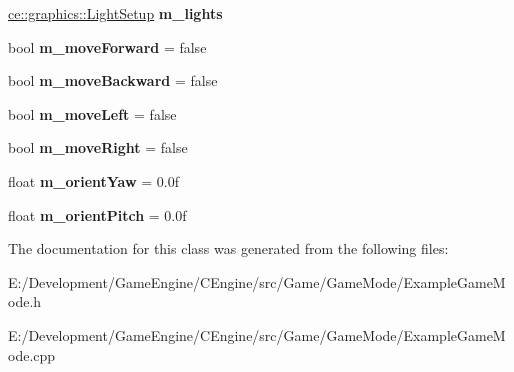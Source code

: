 \begin{DoxyCompactItemize}
\item 
\mbox{\label{classce_1_1game_1_1_example_game_mode_ab39f4d293ea643da5ccac64011366209}} 
\hyperlink{structce_1_1graphics_1_1_light_setup}{ce\+::graphics\+::\+Light\+Setup} {\bfseries m\+\_\+lights}
\item 
\mbox{\label{classce_1_1game_1_1_example_game_mode_aba71b1c261ba5df986a23915413f31e0}} 
bool {\bfseries m\+\_\+move\+Forward} = false
\item 
\mbox{\label{classce_1_1game_1_1_example_game_mode_aacf6c7d0c299cbf0ca24e1e952c3f24a}} 
bool {\bfseries m\+\_\+move\+Backward} = false
\item 
\mbox{\label{classce_1_1game_1_1_example_game_mode_a95c5e1b487e7dda6ac2214a9a3b8c058}} 
bool {\bfseries m\+\_\+move\+Left} = false
\item 
\mbox{\label{classce_1_1game_1_1_example_game_mode_aa45b83aacdc3f4077bd7acb6a55df3f7}} 
bool {\bfseries m\+\_\+move\+Right} = false
\item 
\mbox{\label{classce_1_1game_1_1_example_game_mode_afe9771c52e97b45cc7e509c390c797a3}} 
float {\bfseries m\+\_\+orient\+Yaw} = 0.\+0f
\item 
\mbox{\label{classce_1_1game_1_1_example_game_mode_ae0e5978dfa5f3cd1dc3bde8c6d44effb}} 
float {\bfseries m\+\_\+orient\+Pitch} = 0.\+0f
\end{DoxyCompactItemize}


The documentation for this class was generated from the following files\+:\begin{DoxyCompactItemize}
\item 
E\+:/\+Development/\+Game\+Engine/\+C\+Engine/src/\+Game/\+Game\+Mode/Example\+Game\+Mode.\+h\item 
E\+:/\+Development/\+Game\+Engine/\+C\+Engine/src/\+Game/\+Game\+Mode/Example\+Game\+Mode.\+cpp\end{DoxyCompactItemize}
